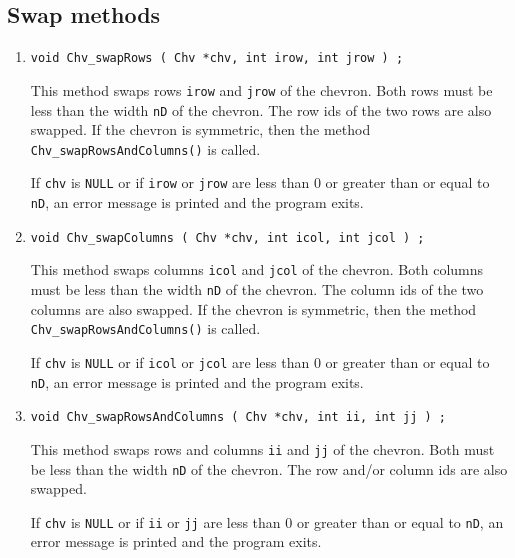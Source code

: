 \subsection{Swap methods}
\label{subsection:Chv:proto:swap}
\par
\begin{enumerate}
\item
\begin{verbatim}
void Chv_swapRows ( Chv *chv, int irow, int jrow ) ;
\end{verbatim}
This method swaps rows {\tt irow} and {\tt jrow} of the chevron.
Both rows must be less than the width {\tt nD} of the chevron.
The row ids of the two rows are also swapped.
If the chevron is symmetric, then the method
{\tt Chv\_swapRowsAndColumns()} is called.
\par {}
If {\tt chv} is {\tt NULL}
or if {\tt irow} or {\tt jrow} are less than 0 or greater than or equal
to {\tt nD},
an error message is printed and the program exits.
\item
\begin{verbatim}
void Chv_swapColumns ( Chv *chv, int icol, int jcol ) ;
\end{verbatim}
This method swaps columns {\tt icol} and {\tt jcol} of the chevron.
Both columns must be less than the width {\tt nD} of the chevron.
The column ids of the two columns are also swapped.
If the chevron is symmetric, then the method
{\tt Chv\_swapRowsAndColumns()} is called.
\par {}
If {\tt chv} is {\tt NULL}
or if {\tt icol} or {\tt jcol} are less than 0 or greater than or equal
to {\tt nD},
an error message is printed and the program exits.
\item
\begin{verbatim}
void Chv_swapRowsAndColumns ( Chv *chv, int ii, int jj ) ;
\end{verbatim}
This method swaps rows and columns {\tt ii} and {\tt jj} of the chevron.
Both must be less than the width {\tt nD} of the chevron.
The row and/or column ids are also swapped.
\par {}
If {\tt chv} is {\tt NULL}
or if {\tt ii} or {\tt jj} are less than 0 or greater than or equal
to {\tt nD},
an error message is printed and the program exits.
\end{enumerate}
\par
